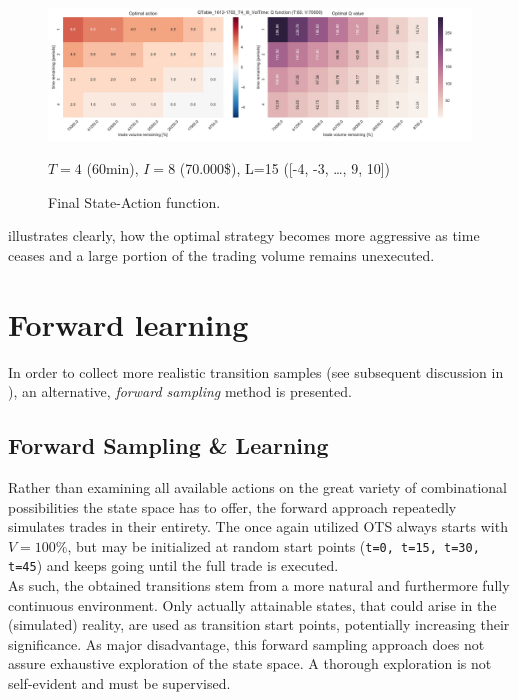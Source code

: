 \begin{figure}[ht]
	\centering
   \includegraphics[width=1.\textwidth]{content/drawings/heatmap_3months}
	\caption{Final State-Action function.}
	$T=4$ (60min), $I=8$ (70.000\$), L=15 ([-4, -3, \ldots{}, 9, 10])
	\label{fig:heatmap}
\end{figure}

 illustrates clearly, how the optimal strategy becomes more aggressive as time ceases and a large portion of the trading volume remains unexecuted.

\section{Forward learning}
\label{chap:forwardlearning}
In order to collect more realistic transition samples (see subsequent discussion in ), an alternative, \emph{forward sampling} method is presented.

\subsection{Forward Sampling \& Learning}
Rather than examining all available actions on the great variety of combinational possibilities the state space has to offer, the forward approach repeatedly simulates trades in their entirety. The once again utilized \ac{OTS} always starts with $V=100\%$, but may be initialized at random start points (\eg \lstinline!t=0, t=15, t=30, t=45!) and keeps going until the full trade is executed.\\

As such, the obtained transitions stem from a more natural and furthermore fully continuous environment. Only actually attainable states, that could arise in the (simulated) reality, are used as transition start points, potentially increasing their significance. As major disadvantage, this forward sampling approach does not assure exhaustive exploration of the state space. A thorough exploration is not self-evident and must be supervised.\\

